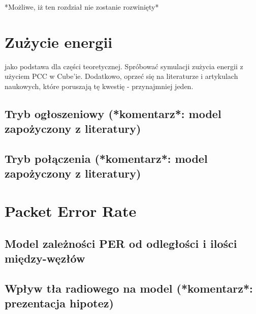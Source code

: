 *Możliwe, iż ten rozdział nie zostanie rozwinięty*
\section{Zużycie energii}
\cite{noauthor_um1718_2022} jako podstawa dla części teoretycznej. Spróbować symulacji zużycia energii z użyciem PCC w Cube'ie.
Dodatkowo, oprzeć się na literaturze i artykulach naukowych, które poruszają tę kwestię - przynajmniej jeden.

\subsection{Tryb ogłoszeniowy (*komentarz*: model zapożyczony z literatury)}
\subsection{Tryb połączenia (*komentarz*: model zapożyczony z literatury)}

\section{Packet Error Rate}
\subsection{Model zależności PER od odległości i ilości między-węzłów}
\subsection{Wpływ tła radiowego na model (*komentarz*: prezentacja hipotez)}


